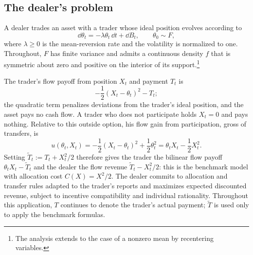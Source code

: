 \documentclass[12pt]{article}
\begin{document}
\subsection{The dealer's problem}\label{sub:app-market}
A dealer trades an asset with a trader whose ideal position evolves
according to
\[
  \dd\theta_t=-\lambda\theta_t\,\dd t+\dd B_t,
  \qquad
  \theta_0\sim F,
\]
where \(\lambda\geq0\) is the mean-reversion rate and the volatility is
normalized to one. Throughout, \(F\) has finite variance and admits a
continuous density \(f\) that is symmetric about zero and positive on
the interior of its support.\footnote{The analysis extends to the case of a nonzero mean by recentering variables.}

The trader's flow payoff from position \(X_t\) and payment \(T_t\) is
\[
  -\frac12(X_t-\theta_t)^2-T_t;
\]
the quadratic term penalizes deviations from the trader's ideal
position, and the asset pays no cash flow. A trader who does not participate holds
\(X_t=0\) and pays nothing. Relative to this outside option, his flow
gain from participation, gross of transfers, is
\[
  u(\theta_t,X_t)
  =
  -\frac12(X_t-\theta_t)^2+\frac12\theta_t^2
  =
  \theta_tX_t-\frac12X_t^2.
\]
Setting \(\widetilde T_t:=T_t+X_t^2/2\) therefore gives the trader the
bilinear flow payoff \(\theta_tX_t-\widetilde T_t\) and the dealer the
flow revenue \(\widetilde T_t-X_t^2/2\): this is the benchmark model
with allocation cost \(C(X)=X^2/2\). The dealer commits to allocation
and transfer rules adapted to the trader's reports and maximizes
expected discounted revenue, subject to incentive compatibility and
individual rationality. Throughout this application, \(T\) continues
to denote the trader's actual payment; \(\widetilde T\) is used only to
apply the benchmark formulas.
\end{document}
